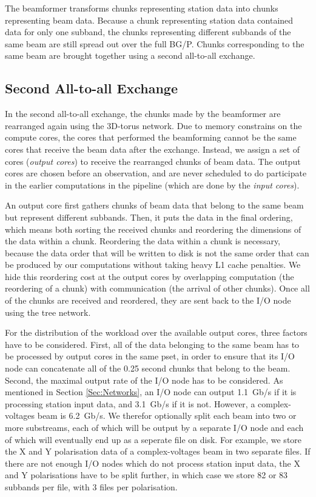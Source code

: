 \documentclass{llncs}
\begin{document}
The beamformer transforms chunks representing station data into chunks representing beam data. Because a chunk representing station data contained data for only one subband, the chunks representing different subbands of the same beam are still spread out over the full BG/P. Chunks corresponding to the same beam are brought together using a second all-to-all exchange.

\subsection{Second All-to-all Exchange}

In the second all-to-all exchange, the chunks made by the beamformer are rearranged again using the 3D-torus network. Due to memory constrains on the compute cores, the cores that performed the beamforming cannot be the same cores that receive the beam data after the exchange. Instead, we assign a set of cores (\emph{output cores}) to receive the rearranged chunks of beam data. The output cores are chosen before an observation, and are never scheduled to do participate in the earlier computations in the pipeline (which are done by the \emph{input cores}).

An output core first gathers chunks of beam data that belong to the same beam but represent different subbands. Then, it puts the data in the final ordering, which means both sorting the received chunks and reordering the dimensions of the data within a chunk. Reordering the data within a chunk is necessary, because the data order that will be written to disk is not the same order that can be produced by our computations without taking heavy L1 cache penalties. We hide this reordering cost at the output cores by overlapping computation (the reordering of a chunk) with communication (the arrival of other chunks). Once all of the chunks are received and reordered, they are sent back to the I/O node using the tree network.

For the distribution of the workload over the available output cores, three factors have to be considered. First, all of the data belonging to the same beam has to be processed by output cores in the same pset, in order to ensure that its I/O node can concatenate all of the 0.25 second chunks that belong to the beam. Second, the maximal output rate of the I/O node has to be considered. As mentioned in Section \ref{Sec:Networks}, an I/O node can output 1.1~Gb/s if it is processing station input data, and 3.1~Gb/s if it is not. However, a complex-voltages beam is 6.2~Gb/s. We therefor optionally split each beam into two or more substreams, each of which will be output by a separate I/O node and each of which will eventually end up as a seperate file on disk. For example, we store the X and Y polarisation data of a complex-voltages beam in two separate files. If there are not enough I/O nodes which do not process station input data, the X and Y polarisations have to be split further, in which case we store 82 or 83 subbands per file, with 3 files per polarisation.
\end{document}
